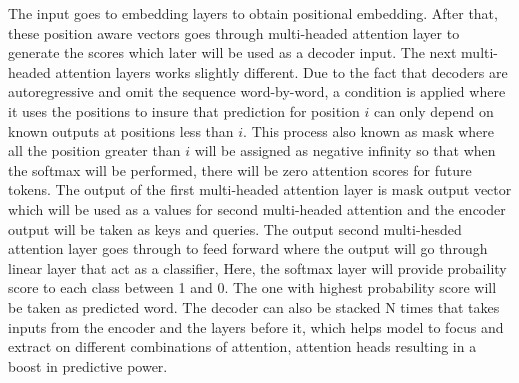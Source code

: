 The input goes to embedding layers to obtain positional embedding. After that, these position aware vectors goes through multi-headed attention layer to generate the scores which later will be used as a decoder input. The next multi-headed attention layers works slightly different. Due to the fact that decoders are autoregressive and omit the sequence word-by-word, a condition is applied where it uses the positions to insure that prediction for position $i$ can only depend on known outputs at positions less than $i$. This process also known as mask where all the position greater than $i$ will be assigned as negative infinity so that when the softmax will be performed, there will be zero attention scores for future tokens. The output of the first multi-headed attention layer is mask output vector which will be used as a values for second multi-headed attention and the encoder output will be taken as keys and queries. The output second multi-hesded attention layer goes through to feed forward where the output will go through linear layer that act as a classifier, Here, the softmax layer will provide probaility score to each class between 1 and 0. The one with highest probability score will be taken as predicted word. The decoder can also be stacked N times that takes inputs from the encoder and the layers before it, which helps model to focus and extract on different combinations of attention, attention heads resulting in a boost in predictive power.











